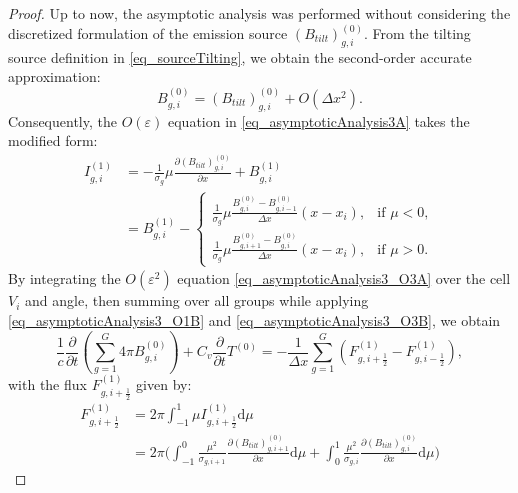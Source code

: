 \documentclass[10pt,a4paper]{amsart}
\newcommand{\dd}{{\text{d}}}
\newcommand{\pdrv}[2]{\frac{\partial{#1}}{\partial{#2}}}
\begin{document}
\begin{proof}
   
    Up to now, the asymptotic analysis was performed without considering  the discretized formulation of the emission source $(B_{tilt})_{g,i}^{(0)}$.
      From the tilting source definition in \eqref{eq_sourceTilting}, we obtain the second-order accurate approximation:
        \begin{equation}
      	B_{g,i}^{(0)} = (B_{tilt})_{g,i}^{(0)} + O(\Delta x^2).
      \end{equation}
      Consequently, the $O(\varepsilon)$ equation in \eqref{eq_asymptoticAnalysis3A} takes the modified form:
    \begin{equation*}
        \begin{aligned}
                I_{g,i}^{(1)} 
                &=- \frac{1}{ \sigma_g} \mu \pdrv{(B_{tilt})_{g,i}^{(0)} }{x}+  B_{g,i}^{(1)}
                \\
                &=   B_{g,i}^{(1)} -
                \begin{cases} 
                  \frac{1}{ \sigma_g} \mu		\frac{B^{(0)}_{g,i  } - B^{(0)}_{g,i-1}}{ \Delta x} \left( x - x_i \right), & \text{if } \mu < 0, \\
                  \frac{1}{ \sigma_g} \mu		\frac{B^{(0)}_{g,i + 1} - B^{(0)}_{g,i}}{ \Delta x} \left( x - x_i \right), & \text{if } \mu > 0.
                \end{cases}
        \end{aligned}
    \end{equation*}
By integrating the $O(\varepsilon^2)$ equation \eqref{eq_asymptoticAnalysis3_O3A} over the cell $V_i$ and angle, then summing over all groups while applying \eqref{eq_asymptoticAnalysis3_O1B} and \eqref{eq_asymptoticAnalysis3_O3B}, we obtain
   \begin{equation}
        \frac{1}{c} \frac{\partial }{\partial t} \left( \sum_{g=1}^G 4 \pi B_{g,i}^{(0)} \right)+C_v \frac{\partial }{\partial t} T^{(0)} = -\frac{1}{\Delta x} \sum_{g=1}^G (F_{g,i+\frac{1}{2}}^{(1)} - F_{g,i-\frac{1}{2}}^{(1)}  ) , 
    \end{equation}
with the flux $F_{g,i+\frac{1}{2}}^{(1)}$ given by:
    \begin{equation*}
        \begin{aligned}
              F_{g,i+\frac{1}{2}}^{(1)} &= 2\pi \int_{-1}^{1} \mu I_{g,i+\frac{1}{2}}^{(1)} \dd{\mu}
              \\
              & =  2\pi \Big( \int_{-1}^{0} \frac{\mu^2}{ \sigma_{g,i+1}}  \pdrv{(B_{tilt})_{g,i+1}^{(0)}}{x} \dd{\mu}  +  \int_{0}^{1} \frac{\mu^2}{ \sigma_{g,i}}  \pdrv{(B_{tilt})_{g,i}^{(0)}  }{x} \dd{\mu}  \Big)

\end{aligned}
\end{equation*}
\end{proof}
\end{document}
